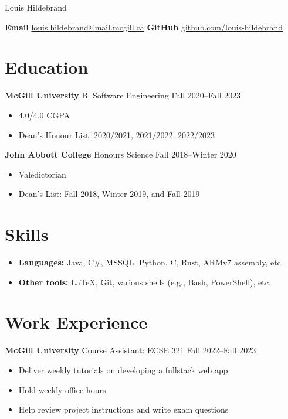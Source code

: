 \begin{center}
	\Huge
	Louis Hildebrand
\end{center}
\vspace{0.5\baselineskip}

\textbf{Email}
\href{mailto:louis.hildebrand@mail.mcgill.ca}{louis.hildebrand@mail.mcgill.ca}
\hfill
\textbf{GitHub}
\href{https://github.com/louis-hildebrand}{github.com/louis-hildebrand}

\section*{Education}

\textbf{McGill University} B. Software Engineering
\hfill
Fall 2020--Fall 2023
\begin{itemize}
	\item 4.0/4.0 CGPA
	\item Dean's Honour List: 2020/2021, 2021/2022, 2022/2023
\end{itemize}

\textbf{John Abbott College} Honours Science
\hfill
Fall 2018--Winter 2020
\begin{itemize}
	\item Valedictorian
	\item Dean's List: Fall 2018, Winter 2019, and Fall 2019
\end{itemize}

\section*{Skills}

\begin{itemize}
	\item \textbf{Languages:} Java, C\#, MSSQL, Python, C, Rust, ARMv7 assembly, etc.
	\item \textbf{Other tools:} \LaTeX, Git, various shells (e.g., Bash, PowerShell), etc.
\end{itemize}

\section*{Work Experience}

\textbf{McGill University} Course Assistant: ECSE 321
\hfill
Fall 2022--Fall 2023
\begin{itemize}
	\item Deliver weekly tutorials on developing a fullstack web app
	\item Hold weekly office hours
	\item Help review project instructions and write exam questions
\end{itemize}

